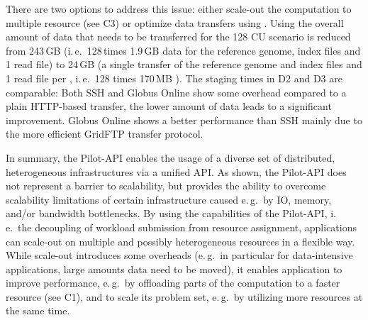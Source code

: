 \documentclass[conference]{IEEEtran}
\begin{document}
There are two options to address this issue: either scale-out the computation
to multiple resource (see C3) or optimize data transfers using \pilotdata.
Using \pilotdata the overall amount of data that needs to be transferred for
the 128 CU scenario is reduced from 243\,GB (i.\,e.\ 128\,\cus times 1.9\,GB
data for the reference genome, index files and 1 read file) to 24\,GB (a
single transfer of the reference genome and index files and 1 read file per
\cu, i.\,e.\ 128 times 170\,MB ). The staging times in D2 and D3 are
comparable: Both SSH and Globus Online show some overhead compared to a plain
HTTP-based transfer, the lower amount of data leads to a significant
improvement. Globus Online shows a better performance than SSH mainly due to
the more efficient GridFTP transfer protocol.



 



  In summary, the Pilot-API enables the usage of a diverse
set of distributed, heterogeneous infrastructures via a unified
API. As shown, the Pilot-API does not represent a barrier to
scalability, but provides the ability to overcome scalability
limitations of certain infrastructure caused e.\,g.\ by IO, memory,
and/or bandwidth bottlenecks. By using the capabilities of the
Pilot-API, i.\,e.\ the decoupling of workload submission from resource
assignment, applications can scale-out on multiple and possibly
heterogeneous resources in a flexible way. While scale-out introduces
some overheads (e.\,g.\ in particular for data-intensive applications,
large amounts data need to be moved), it enables application to
improve performance, e.\,g.\ by offloading parts of the computation to
a faster resource (see C1), and to scale its problem set, e.\,g.\ by
utilizing more resources at the same time.



\end{document}
